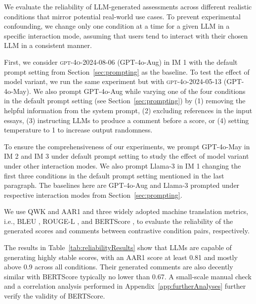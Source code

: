 We evaluate the reliability of LLM-generated assessments across different realistic conditions that mirror potential real-world use cases. To prevent experimental confounding, we change only one condition at a time for a given LLM in a specific interaction mode, assuming that users tend to interact with their chosen LLM in a consistent manner.

First, we consider \textsc{gpt-4o-2024-08-06} (GPT-4o-Aug) in IM 1 with the default prompt setting from Section~\ref{sec:prompting} as the baseline. To test the effect of model variant, we run the same experiment but with \textsc{gpt-4o-2024-05-13} (GPT-4o-May). We also prompt GPT-4o-Aug while varying one of the four conditions in the default prompt setting (see Section~\ref{sec:prompting}) by (1) removing the helpful information from the system prompt, (2) excluding references in the input essays, (3) instructing LLMs to produce a comment before a score, or (4) setting temperature to 1 to increase output randomness. 

To ensure the comprehensiveness of our experiments, we prompt GPT-4o-May in IM 2 and IM 3 under default prompt setting to study the effect of model variant under other interaction modes. We also prompt Llama-3 in IM 1 changing the first three conditions in the default prompt setting mentioned in the last paragraph. The baselines here are GPT-4o-Aug and Llama-3 prompted under respective interaction modes from Section~\ref{sec:prompting}.

We use QWK and AAR1 and three widely adopted machine translation metrics, i.e., BLEU \citep{papineni2002bleu}, ROUGE-L \citep{lin-2004-rouge}, and BERTScore \citep{bert-score}, to evaluate the reliability of the generated scores and comments between contrastive condition pairs, respectively. 

The results in Table~\ref{tab:reliabilityResults} show that LLMs are capable of generating highly stable scores, with an AAR1 score at least 0.81 and mostly above 0.9 across all conditions. Their generated comments are also decently similar with BERTScore typically no lower than 0.67. A small-scale manual check and a correlation analysis performed in Appendix~\ref{app:furtherAnalyses} further verify the validity of BERTScore.







